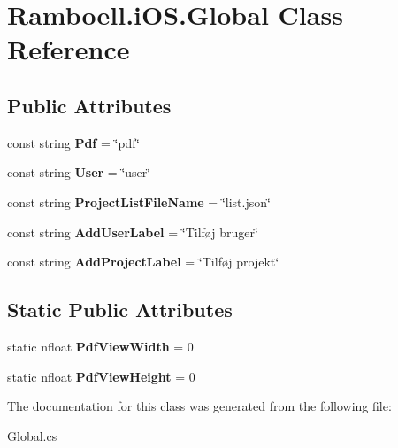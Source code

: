 \hypertarget{class_ramboell_1_1i_o_s_1_1_global}{}\section{Ramboell.\+i\+O\+S.\+Global Class Reference}
\label{class_ramboell_1_1i_o_s_1_1_global}
\subsection*{Public Attributes}
\begin{DoxyCompactItemize}
\item 
\mbox{\label{class_ramboell_1_1i_o_s_1_1_global_ae8d76d3d2a5f72b0c37386a8976dbc34}} 
const string {\bfseries Pdf} = \char`\"{}pdf\char`\"{}
\item 
\mbox{\label{class_ramboell_1_1i_o_s_1_1_global_a30a6ccae88af77bbaacd121b7c707a73}} 
const string {\bfseries User} = \char`\"{}user\char`\"{}
\item 
\mbox{\label{class_ramboell_1_1i_o_s_1_1_global_a23d8cd28e3aa412d459934cd1ec82a74}} 
const string {\bfseries Project\+List\+File\+Name} = \char`\"{}list.\+json\char`\"{}
\item 
\mbox{\label{class_ramboell_1_1i_o_s_1_1_global_a09c22c3d3e5af72fa96fde5f5a2a3fef}} 
const string {\bfseries Add\+User\+Label} = \char`\"{}Tilføj bruger\char`\"{}
\item 
\mbox{\label{class_ramboell_1_1i_o_s_1_1_global_a426db0fd3d089804ea567d6024b29167}} 
const string {\bfseries Add\+Project\+Label} = \char`\"{}Tilføj projekt\char`\"{}
\end{DoxyCompactItemize}
\subsection*{Static Public Attributes}
\begin{DoxyCompactItemize}
\item 
\mbox{\label{class_ramboell_1_1i_o_s_1_1_global_aef9c2dceecf492a31f04ddfb138e73b8}} 
static nfloat {\bfseries Pdf\+View\+Width} = 0
\item 
\mbox{\label{class_ramboell_1_1i_o_s_1_1_global_acb23d3ce312697f64e00118afbba0ef9}} 
static nfloat {\bfseries Pdf\+View\+Height} = 0
\end{DoxyCompactItemize}


The documentation for this class was generated from the following file\+:\begin{DoxyCompactItemize}
\item 
Global.\+cs\end{DoxyCompactItemize}
